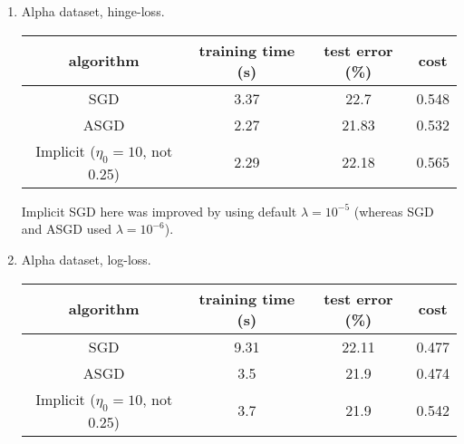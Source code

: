 \documentclass{article}
\begin{document}
\begin{enumerate}[(a)]
\begin{enumerate}[1.]
\item Alpha dataset, hinge-loss.
\begin{center}
\begin{tabular}{ c | c | c | c }
  algorithm & training time (s) & test error (\%) & cost \\ \hline                       
  SGD & 3.37 & 22.7 & 0.548\\
  ASGD & 2.27 & 21.83 & 0.532\\
  Implicit ($\eta_0=10$, not 0.25) & 2.29 & 22.18 & 0.565\\
\end{tabular}
\end{center}
Implicit SGD here was improved by using default $\lambda = 10^{-5}$ (whereas SGD and ASGD used $\lambda = 10^{-6}$).

\item Alpha dataset, log-loss.
\begin{center}
\begin{tabular}{ c | c | c | c }
  algorithm & training time (s) & test error (\%) & cost \\ \hline                       
  SGD & 9.31 &  22.11 & 0.477\\
  ASGD & 3.5 & 21.9 & 0.474\\
  Implicit ($\eta_0=10$, not 0.25) & 3.7 & 21.9 & 0.542\\
\end{tabular}
\end{center}
\end{enumerate}
\end{enumerate}
\end{document}
